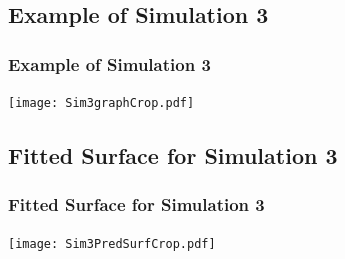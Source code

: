 \documentclass[mathserif,compress]{beamer}
\begin{document}

\subsection{Example of Simulation 3}
\begin{frame}
\frametitle{Example of Simulation 3}

	\begin{center} 
		\texttt{[image: Sim3graphCrop.pdf]} 
	\end{center}

\end{frame}


\subsection{Fitted Surface for Simulation 3}
\begin{frame}
\frametitle{Fitted Surface for Simulation 3}

	\begin{center} 
		\texttt{[image: Sim3PredSurfCrop.pdf]} 
	\end{center}

\end{frame}

\end{document}
